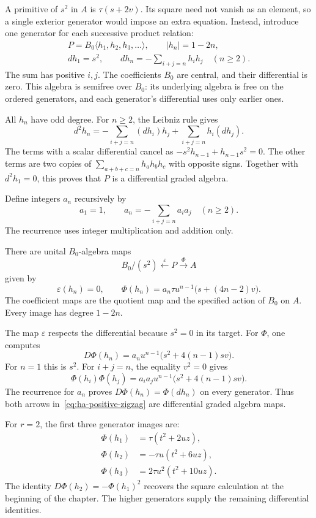 A primitive of $s^2$ in $A$ is $\tau(s+2v)$.
Its square need not vanish as an element, so a single exterior
generator would impose an extra equation. Instead, introduce one
generator for each successive product relation:
\begin{equation}\label{eq:ha-semifree-algebra}
 \begin{gathered}
 P=B_0\langle h_1,h_2,h_3,\ldots\rangle,\qquad |h_n|=1-2n,\\
 dh_1=s^2,\qquad
 dh_n=-\sum_{i+j=n}h_ih_j\quad(n\geq2).
 \end{gathered}
\end{equation}
The sum has positive $i,j$. The coefficients $B_0$ are central,
and their differential is zero. This algebra is semifree over $B_0$:
its underlying algebra is free on the ordered generators, and each
generator's differential uses only earlier ones.

All $h_n$ have odd degree. For $n\geq2$, the Leibniz rule gives
\[
 d^2h_n=-\sum_{i+j=n}(dh_i)h_j+
          \sum_{i+j=n}h_i(dh_j).
\]
The terms with a scalar differential cancel as
$-s^2h_{n-1}+h_{n-1}s^2=0$.
The other terms are two copies of
$\sum_{a+b+c=n}h_ah_bh_c$ with opposite signs.
Together with $d^2h_1=0$, this proves that $P$ is a differential
graded algebra.

Define integers $a_n$ recursively by
\[
 a_1=1,\qquad a_n=-\sum_{i+j=n}a_ia_j\quad(n\geq2).
\]
The recurrence uses integer multiplication and addition only.

There are unital $B_0$-algebra maps
\begin{equation}\label{eq:ha-positive-zigzag}
 B_0/(s^2)\xleftarrow{\ \varepsilon\ }P
          \xrightarrow{\ \Phi\ }A
\end{equation}
given by
\[
 \varepsilon(h_n)=0,\qquad
 \Phi(h_n)=a_n\tau u^{n-1}\bigl(s+(4n-2)v\bigr).
\]
The coefficient maps are the quotient map and the specified action
of $B_0$ on $A$. Every image has degree $1-2n$.

The map $\varepsilon$ respects the differential because $s^2=0$
in its target. For $\Phi$, one computes
\[
 D\Phi(h_n)=a_nu^{n-1}\bigl(s^2+4(n-1)sv\bigr).
\]
For $n=1$ this is $s^2$.
For $i+j=n$, the equality $v^2=0$ gives
\[
 \Phi(h_i)\Phi(h_j)
 =a_ia_j u^{n-1}\bigl(s^2+4(n-1)sv\bigr).
\]
The recurrence for $a_n$ proves $D\Phi(h_n)=\Phi(dh_n)$ on
every generator. Thus both arrows in~\eqref{eq:ha-positive-zigzag}
are differential graded algebra maps.

For $r=2$, the first three generator images are:
\[
 \begin{split}
 \Phi(h_1)&=\tau(t^2+2uz),\\
 \Phi(h_2)&=-\tau u(t^2+6uz),\\
 \Phi(h_3)&=2\tau u^2(t^2+10uz).
 \end{split}
\]
The identity $D\Phi(h_2)=-\Phi(h_1)^2$ recovers the square
calculation at the beginning of the chapter. The higher generators
supply the remaining differential identities.

